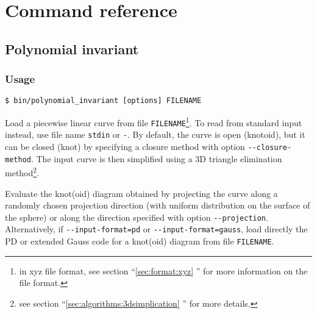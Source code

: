 % 
% 
% 
% 

\section{\label{sec:reference}Command reference}

\subsection{Polynomial invariant}
\subsubsection{Usage}
\begin{lstlisting}
$ bin/polynomial_invariant [options] FILENAME
\end{lstlisting}

Load a piecewise linear curve from file  \lstinline{FILENAME}\footnote{in xyz file format, see section ``\ref{sec:format:xyz} '' for more information on the file format.}. To read from standard input instead, use file name \lstinline{stdin} or \lstinline{-}. By default, the curve is open (knotoid), but it can be closed (knot) by specifying a closure method with option \lstinline{--closure-method}. 
The input curve is then simplified using a 3D triangle elimination method\footnote{see section  ``\ref{sec:algorithms:3dsimplication} '' for more details.}.

Evaluate the knot(oid) diagram obtained by projecting the curve along  a randomly chosen projection direction (with uniform distribution on the surface of the sphere) or along the direction specified with option \lstinline{--projection}.
Alternatively, if \lstinline{--input-format=pd} or \lstinline{--input-format=gauss}, load directly the PD or extended Gauss code for a knot(oid) diagram from file \lstinline{FILENAME}.

